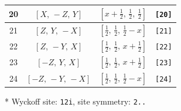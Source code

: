 \documentclass[fleqn,8pt]{jsarticle}
\begin{document}
\begin{longtable}{cccc}
20 & $\left[ X,\, - Z,\, Y \right]$ & $\left[ x + \frac{1}{2},\, \frac{1}{2},\, \frac{1}{2} \right]$ & {\tt [20]} \\ \hline
21 & $\left[ Z,\, Y,\, - X \right]$ & $\left[ \frac{1}{2},\, \frac{1}{2},\, \frac{1}{2} - x \right]$ & {\tt [21]} \\ \hline
22 & $\left[ Z,\, - Y,\, X \right]$ & $\left[ \frac{1}{2},\, \frac{1}{2},\, x + \frac{1}{2} \right]$ & {\tt [22]} \\ \hline
23 & $\left[ - Z,\, Y,\, X \right]$ & $\left[ \frac{1}{2},\, \frac{1}{2},\, x + \frac{1}{2} \right]$ & {\tt [23]} \\ \hline
24 & $\left[ - Z,\, - Y,\, - X \right]$ & $\left[ \frac{1}{2},\, \frac{1}{2},\, \frac{1}{2} - x \right]$ & {\tt [24]} \\
\end{longtable}
* Wyckoff site: {\tt 12i}, site symmetry: {\tt 2..}
\renewcommand{\arraystretch}{1.2}
\end{document}
